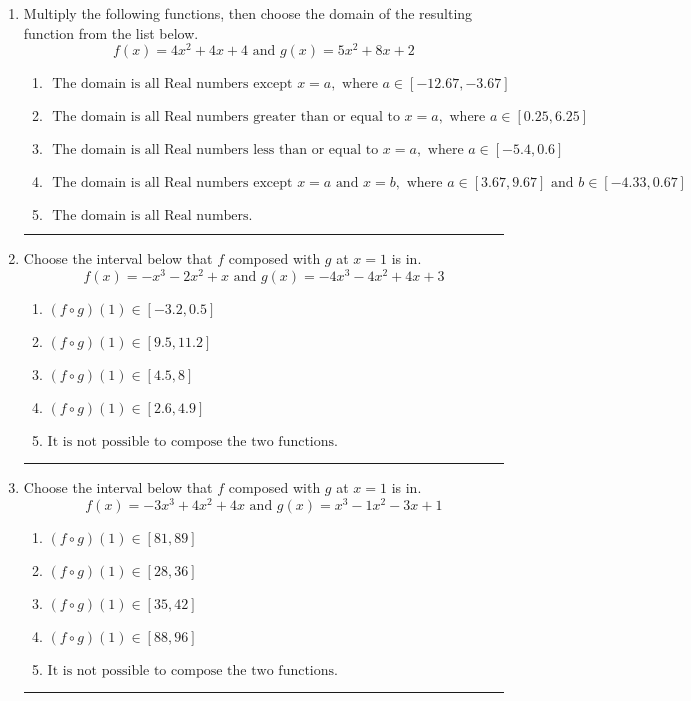\documentclass[14pt]{extbook}
\newcommand{\litem}[1]{\item#1\hspace*{-1cm}\rule{\textwidth}{0.4pt}}
\begin{document}
\begin{enumerate}
\litem{
Multiply the following functions, then choose the domain of the resulting function from the list below.\[ f(x) = 4x^{2} +4 x + 4 \text{ and } g(x) = 5x^{2} +8 x + 2 \]\begin{enumerate}[label=\Alph*.]
\item \( \text{ The domain is all Real numbers except } x = a, \text{ where } a \in [-12.67, -3.67] \)
\item \( \text{ The domain is all Real numbers greater than or equal to } x = a, \text{ where } a \in [0.25, 6.25] \)
\item \( \text{ The domain is all Real numbers less than or equal to } x = a, \text{ where } a \in [-5.4, 0.6] \)
\item \( \text{ The domain is all Real numbers except } x = a \text{ and } x = b, \text{ where } a \in [3.67, 9.67] \text{ and } b \in [-4.33, 0.67] \)
\item \( \text{ The domain is all Real numbers. } \)

\end{enumerate} }
\litem{
Choose the interval below that $f$ composed with $g$ at $x=1$ is in.\[ f(x) = -x^{3} -2 x^{2} +x \text{ and } g(x) = -4x^{3} -4 x^{2} +4 x + 3 \]\begin{enumerate}[label=\Alph*.]
\item \( (f \circ g)(1) \in [-3.2, 0.5] \)
\item \( (f \circ g)(1) \in [9.5, 11.2] \)
\item \( (f \circ g)(1) \in [4.5, 8] \)
\item \( (f \circ g)(1) \in [2.6, 4.9] \)
\item \( \text{It is not possible to compose the two functions.} \)

\end{enumerate} }
\litem{
Choose the interval below that $f$ composed with $g$ at $x=1$ is in.\[ f(x) = -3x^{3} +4 x^{2} +4 x \text{ and } g(x) = x^{3} -1 x^{2} -3 x + 1 \]\begin{enumerate}[label=\Alph*.]
\item \( (f \circ g)(1) \in [81, 89] \)
\item \( (f \circ g)(1) \in [28, 36] \)
\item \( (f \circ g)(1) \in [35, 42] \)
\item \( (f \circ g)(1) \in [88, 96] \)
\item \( \text{It is not possible to compose the two functions.} \)


\end{enumerate}}
\end{enumerate}
\end{document}
